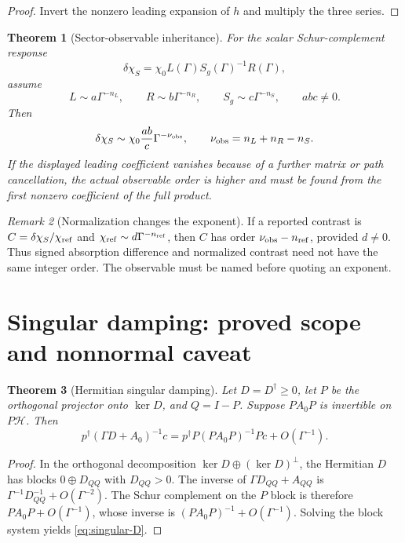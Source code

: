 \documentclass[11pt,a4paper]{article}
\newtheorem{theorem}{Theorem}[section]
\theoremstyle{remark}
\newtheorem{remark}[theorem]{Remark}
\newcommand{\dchi}{\delta\chi_S}
\begin{document}
\begin{proof}
Invert the nonzero leading expansion of $h$ and multiply the three series.
\end{proof}

\begin{theorem}[Sector-observable inheritance]
\label{thm:inheritance}
For the scalar Schur-complement response
\[
\dchi=\chi_0 L(\Gamma)S_g(\Gamma)^{-1}R(\Gamma),
\]
assume
\[
L\sim a\Gamma^{-n_L},\qquad
R\sim b\Gamma^{-n_R},\qquad
S_g\sim c\Gamma^{-n_S},
\qquad abc\ne0.
\]
Then
\begin{equation}
\dchi\sim\chi_0\frac{ab}{c}
\Gamma^{-\nu_{\rm obs}},
\qquad
\nu_{\rm obs}=n_L+n_R-n_S.
\label{eq:inheritance}
\end{equation}
If the displayed leading coefficient vanishes because of a further matrix or
path cancellation, the actual observable order is higher and must be found
from the first nonzero coefficient of the full product.
\end{theorem}

\begin{remark}[Normalization changes the exponent]
If a reported contrast is $C=\dchi/\chi_{\rm ref}$ and
$\chi_{\rm ref}\sim d\Gamma^{-n_{\rm ref}}$, then
$C$ has order $\nu_{\rm obs}-n_{\rm ref}$, provided $d\ne0$.  Thus signed
absorption difference and normalized contrast need not have the same integer
order.  The observable must be named before quoting an exponent.
\end{remark}

\section{Singular damping: proved scope and nonnormal caveat}

\begin{theorem}[Hermitian singular damping]
\label{thm:singular-D}
Let $D=D^\dagger\ge0$, let $P$ be the orthogonal projector onto $\ker D$, and
$Q=I-P$.  Suppose $PA_0P$ is invertible on $P\mathcal H$.  Then
\begin{equation}
p^\dagger(\Gamma D+A_0)^{-1}c
=p^\dagger P(PA_0P)^{-1}Pc+O(\Gamma^{-1}).
\label{eq:singular-D}
\end{equation}
\end{theorem}

\begin{proof}
In the orthogonal decomposition
$\ker D\oplus(\ker D)^\perp$, the Hermitian $D$ has blocks
$0\oplus D_{QQ}$ with $D_{QQ}>0$.  The inverse of
$\Gamma D_{QQ}+A_{QQ}$ is $\Gamma^{-1}D_{QQ}^{-1}+O(\Gamma^{-2})$.
The Schur complement on the $P$ block is therefore
$PA_0P+O(\Gamma^{-1})$, whose inverse is
$(PA_0P)^{-1}+O(\Gamma^{-1})$.  Solving the block system yields
\eqref{eq:singular-D}.
\end{proof}
\end{document}
